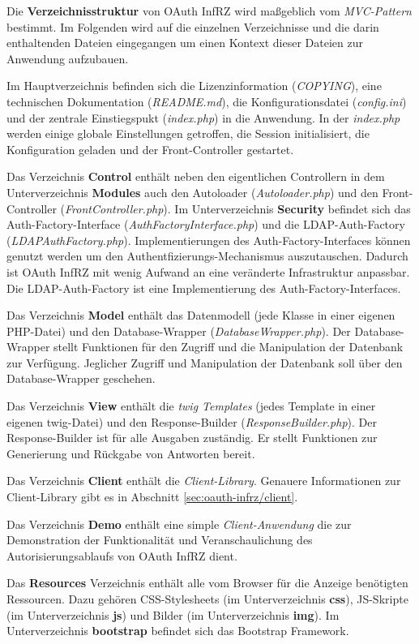 \documentclass[12pt,a4paper,pointednumbers,abstracton]{scrartcl}
\begin{document}
Die \textbf{Verzeichnisstruktur} von OAuth InfRZ wird maßgeblich vom \emph{MVC-Pattern} bestimmt.
Im Folgenden wird auf die einzelnen Verzeichnisse und die darin enthaltenden Dateien eingegangen um einen Kontext dieser Dateien zur Anwendung aufzubauen.

Im Hauptverzeichnis befinden sich die Lizenzinformation (\emph{COPYING}), eine technischen Dokumentation (\emph{README.md}), die Konfigurationsdatei (\emph{config.ini}) und der zentrale Einstiegspukt (\emph{index.php}) in die Anwendung.
In der \emph{index.php} werden einige globale Einstellungen getroffen, die Session initialisiert, die Konfiguration geladen und der Front-Controller gestartet.

Das Verzeichnis \textbf{Control} enthält neben den eigentlichen Controllern in dem Unterverzeichnis \textbf{Modules} auch den Autoloader (\emph{Autoloader.php}) und den Front-Controller (\emph{FrontController.php}).
Im Unterverzeichnis \textbf{Security} befindet sich das Auth-Factory-Interface (\emph{AuthFactoryInterface.php}) und die LDAP-Auth-Factory (\emph{LDAPAuthFactory.php}).
Implementierungen des Auth-Factory-Interfaces können genutzt werden um den Authentfizierungs-Mechanismus auszutauschen.
Dadurch ist OAuth InfRZ mit wenig Aufwand an eine veränderte Infrastruktur anpassbar.
Die LDAP-Auth-Factory ist eine Implementierung des Auth-Factory-Interfaces.

Das Verzeichnis \textbf{Model} enthält das Datenmodell (jede Klasse in einer eigenen PHP-Datei) und den Database-Wrapper (\emph{DatabaseWrapper.php}).
Der Database-Wrapper stellt Funktionen für den Zugriff und die Manipulation der Datenbank zur Verfügung.
Jeglicher Zugriff und Manipulation der Datenbank soll über den Database-Wrapper geschehen.

Das Verzeichnis \textbf{View} enthält die \emph{twig Templates} (jedes Template in einer eigenen twig-Datei) und den Response-Builder (\emph{ResponseBuilder.php}).
Der Response-Builder ist für alle Ausgaben zuständig.
Er stellt Funktionen zur Generierung und Rückgabe von Antworten bereit.

Das Verzeichnis \textbf{Client} enthält die \emph{Client-Library}. Genauere Informationen zur Client-Library gibt es in Abschnitt \ref{sec:oauth-infrz/client}.

Das Verzeichnis \textbf{Demo} enthält eine simple \emph{Client-Anwendung} die zur Demonstration der Funktionalität und Veranschaulichung des Autorisierungsablaufs von OAuth InfRZ dient.

Das \textbf{Resources} Verzeichnis enthält alle vom Browser für die Anzeige benötigten Ressourcen. Dazu gehören CSS-Stylesheets (im Unterverzeichnis \textbf{css}), JS-Skripte (im Unterverzeichnis \textbf{js}) und Bilder (im Unterverzeichnis \textbf{img}). Im Unterverzeichnis \textbf{bootstrap} befindet sich das Bootstrap Framework.
\end{document}
